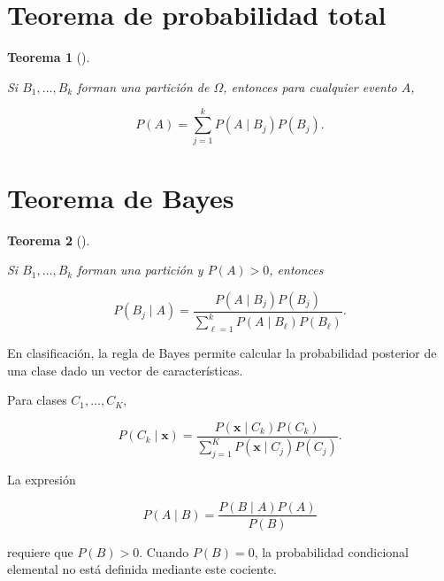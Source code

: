 \documentclass[
  spanish,
  10.5pt,
  letterpaper,
  DIV=11,
  numbers=noendperiod,
  oneside,
  open=any]{scrreprt}
\theoremstyle{definition}
\theoremstyle{definition}
\theoremstyle{plain}
\newtheorem{theorem}{Teorema}[chapter]
\theoremstyle{remark}
\begin{document}
\section*{Teorema de probabilidad
total}\label{teorema-de-probabilidad-total}


\begin{theorem}[]\protect\hypertarget{thm-probabilidad-total}{}\label{thm-probabilidad-total}

Si \(B_1,\ldots,B_k\) forman una partición de \(\Omega\), entonces para
cualquier evento \(A\),

\[
P(A)
=
\sum_{j=1}^{k}
P(A\mid B_j)P(B_j).
\]

\end{theorem}

\section*{Teorema de Bayes}\label{teorema-de-bayes}


\begin{theorem}[]\protect\hypertarget{thm-bayes}{}\label{thm-bayes}

Si \(B_1,\ldots,B_k\) forman una partición y \(P(A)>0\), entonces

\[
P(B_j\mid A)
=
\frac{
P(A\mid B_j)P(B_j)
}{
\sum_{\ell=1}^{k}
P(A\mid B_\ell)P(B_\ell)
}.
\]

\end{theorem}

En clasificación, la regla de Bayes permite calcular la probabilidad
posterior de una clase dado un vector de características.

Para clases \(C_1,\ldots,C_K\),

\[
P(C_k\mid\mathbf{x})
=
\frac{
P(\mathbf{x}\mid C_k)P(C_k)
}{
\sum_{j=1}^{K}
P(\mathbf{x}\mid C_j)P(C_j)
}.
\]

\begin{tcolorbox}[enhanced jigsaw, arc=.35mm, bottomrule=.15mm, bottomtitle=1mm, breakable, colback=white, colbacktitle=quarto-callout-important-color!10!white, colframe=quarto-callout-important-color-frame, coltitle=black, left=2mm, leftrule=.75mm, opacityback=0, opacitybacktitle=0.6, rightrule=.15mm, title=\textcolor{quarto-callout-important-color}{\faExclamation}\hspace{0.5em}{Condición para aplicar Bayes}, titlerule=0mm, toprule=.15mm, toptitle=1mm]

La expresión

\[
P(A\mid B)
=
\frac{P(B\mid A)P(A)}{P(B)}
\]

requiere que \(P(B)>0\). Cuando \(P(B)=0\), la probabilidad condicional
elemental no está definida mediante este cociente.

\end{tcolorbox}
\end{document}

